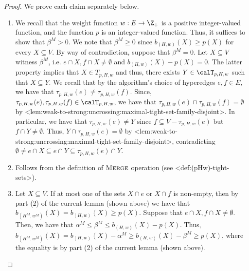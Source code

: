 \documentclass{article}
\def\Cref#1{<#1>}%
\newcommand{\maximalTightSetFamily}[1]{\ensuremath{\calT_{#1}}\xspace}
\newcommand{\tightSetFamily}[1]{\ensuremath{T_{#1}}\xspace}
\newcommand{\maximalTightSetContainingHyperedge}[1]{\ensuremath{\tau_{#1}}\xspace}
\newcommand{\merge}{\ensuremath{\textsc{Merge}}\xspace}
\begin{document}
\begin{proof} We prove each claim separately below.
\begin{enumerate}
    \item We recall that the weight function $w:E\rightarrow\Z_+$ is a positive integer-valued function, and the function $p$ is an integer-valued function. Thus, it suffices to show that $\beta^M > 0$. We note that $\beta^M \geq 0$ since $b_{(H,w)}(X) \ge p(X)$ for every $X \subseteq V$. By way of contradiction, suppose that $\beta^M = 0$. Let $X \subseteq V$ witness $\beta^M$, i.e. $e \cap X, f\cap X \not = \emptyset$ and $b_{(H,w)}(X) -p(X)= 0$.
    The latter property implies that $X \in \tightSetFamily{p, H, w}$ and thus, there exists $Y \in \maximalTightSetFamily{p, H, w}$ such that $X \subseteq Y$. 
    We recall that by the algorithm's choice of hyperedges $e, f \in E$, we have that $\maximalTightSetContainingHyperedge{p, H, w}(e) \not = \maximalTightSetContainingHyperedge{p, H, w}(f)$. Since, $\maximalTightSetContainingHyperedge{p, H, w}(e), \maximalTightSetContainingHyperedge{p, H, w}(f) \in \maximalTightSetFamily{p, H, w}$, we have that $\maximalTightSetContainingHyperedge{p, H, w}(e) \cap \maximalTightSetContainingHyperedge{p, H, w}(f) = \emptyset$ by \Cref{lem:weak-to-strong:uncrossing:maximal-tight-set-family-disjoint}. In particular, we have that $\maximalTightSetContainingHyperedge{p, H, w}(e) \not = Y$ since
    $f \subseteq V - \maximalTightSetContainingHyperedge{p, H, w}(e)$ but $f \cap Y \not = \emptyset$.
    Thus, $Y\cap \maximalTightSetContainingHyperedge{p, H, w}(e) = \emptyset$ by \Cref{lem:weak-to-strong:uncrossing:maximal-tight-set-family-disjoint}, contradicting $\emptyset\neq e\cap X\subseteq e \cap Y \subseteq \maximalTightSetContainingHyperedge{p, H, w}(e)\cap Y$. 

    \item Follows from the definition of \merge operation (see \Cref{def:(pHw)-tight-sets}).
    
    \item 
    Let $X \subseteq V$. If at most one of the sets $X\cap e$ or $X\cap f$ is non-empty, then by part (2) of the current lemma (shown above) we have that $b_{(H^M, w^M)}(X) = b_{(H,w)}(X) \geq p(X)$. Suppose that $e\cap X, f\cap X \not = \emptyset$. Then, we have that $\alpha^M \leq \beta^M \leq b_{(H,w)}(X) - p(X)$.
    Thus,  
    $b_{(H^M, w^M)}(X) = b_{(H,w)}(X) - \alpha^M \geq b_{(H,w)}(X) - \beta^M \geq p(X)$, where the equality is by part (2) of the current lemma (shown above).


\end{enumerate}
\end{proof}
\end{document}
